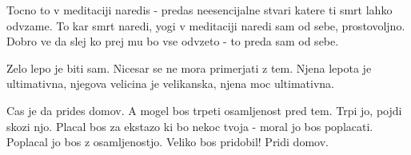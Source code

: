Tocno to v meditaciji naredis - predas neesencijalne stvari katere ti smrt lahko odvzame. To kar smrt naredi, yogi v meditaciji naredi sam od sebe, prostovoljno. Dobro ve da slej ko prej mu bo vse odvzeto - to preda sam od sebe. 

Zelo lepo je biti sam. Nicesar se ne mora primerjati z tem. Njena lepota je ultimativna, njegova velicina je velikanska, njena moc ultimativna. 

Cas je da prides domov. A mogel bos trpeti osamljenost pred tem. Trpi jo, pojdi skozi njo. Placal bos za ekstazo ki bo nekoc tvoja - moral jo bos poplacati. Poplacal jo bos z osamljenostjo. Veliko bos pridobil! Pridi domov. 